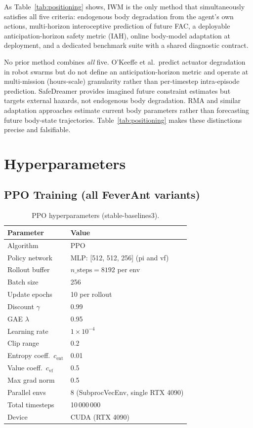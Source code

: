 \documentclass{article}
\begin{document}
{\smallskip
\noindent As Table~\ref{tab:positioning} shows, IWM is the only method that simultaneously satisfies all five criteria: endogenous body degradation from the agent's own actions, multi-horizon interoceptive prediction of future FAC, a deployable anticipation-horizon safety metric (IAH), online body-model adaptation at deployment, and a dedicated benchmark suite with a shared diagnostic contract.

No prior method combines \emph{all} five. O'Keeffe et al.\ predict actuator degradation in robot swarms but do not define an anticipation-horizon metric and operate at multi-mission (hours-scale) granularity rather than per-timestep intra-episode prediction. SafeDreamer provides imagined future constraint estimates but targets external hazards, not endogenous body degradation. RMA and similar adaptation approaches estimate current body parameters rather than forecasting future body-state trajectories. Table~\ref{tab:positioning} makes these distinctions precise and falsifiable.

\section{Hyperparameters}
\label{app:hyperparams}

\subsection*{PPO Training (all FeverAnt variants)}
\vspace{-4pt}
\begin{table}[H]
\centering
\caption{PPO hyperparameters (stable-baselines3).}
\begin{tabular}{ll}
\toprule
Parameter & Value \\
\midrule
Algorithm & PPO \citep{schulman2017ppo} \\
Policy network & MLP: [512, 512, 256] (pi and vf) \\
Rollout buffer & $n\_\text{steps} = 8192$ per env \\
Batch size & 256 \\
Update epochs & 10 per rollout \\
Discount $\gamma$ & 0.99 \\
GAE $\lambda$ & 0.95 \\
Learning rate & $1 \times 10^{-4}$ \\
Clip range & 0.2 \\
Entropy coeff.\ $c_\text{ent}$ & 0.01 \\
Value coeff.\ $c_\text{vf}$ & 0.5 \\
Max grad norm & 0.5 \\
Parallel envs & 8 (SubprocVecEnv, single RTX 4090) \\
Total timesteps & 10\,000\,000 \\
Device & CUDA (RTX 4090) \\
\bottomrule
\end{tabular}
\end{table}

}
\end{document}
